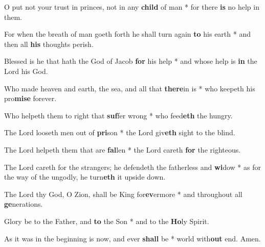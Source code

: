 \begin{multicols}{2}
	O put not your trust in princes, not in any \textbf{child} of man * for there \textbf{is} no help in them.
	
	For when the breath of man goeth forth he shall turn again \textbf{to} his earth * and then all \textbf{his} thoughts perish.
	
	Blessed is he that hath the God of Jacob \textbf{for} his help * and whose help is \textbf{in} the Lord his God.
	
	Who made heaven and earth, the sea, and all that \textbf{there}in is * who keepeth his pro\textbf{mise} forever.
	
	Who helpeth them to right that \textbf{suf}fer wrong * who feed\textbf{eth} the hungry.
	
	The Lord looseth men out of \textbf{pri}son * the Lord giv\textbf{eth} sight to the blind.
	
	The Lord helpeth them that are \textbf{fal}len * the Lord careth \textbf{for} the righteous.
	
	The Lord careth for the strangers; he defendeth the fatherless and \textbf{wi}dow * as for the way of the ungodly, he turn\textbf{eth} it upside down.
	
	The Lord thy God, O Zion, shall be King for\textbf{ev}ermore * and throughout all \textbf{ge}nerations.
	
	Glory be to the Father, and \textbf{to} the Son * and to the \textbf{Ho}ly Spirit.
	
	As it was in the beginning is now, and ever \textbf{shall} be * world with\textbf{out} end. Amen.
\end{multicols}
